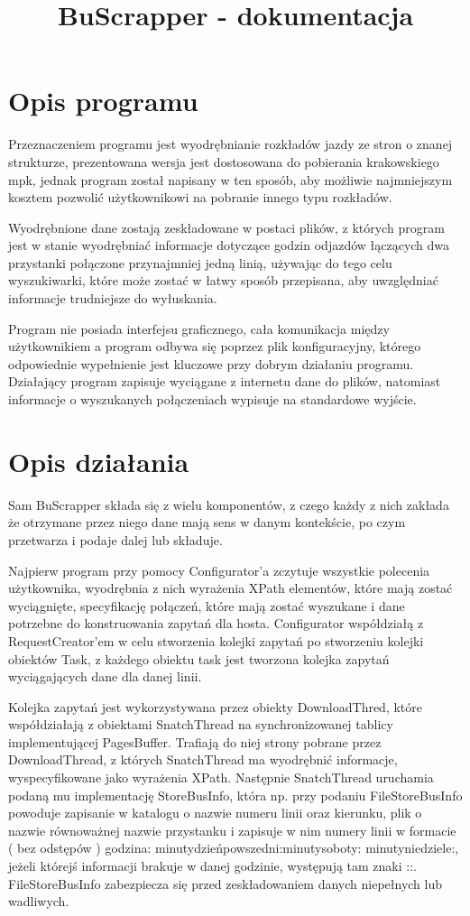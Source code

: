 \documentclass{article}
\title{BuScrapper - dokumentacja}
\begin{document}
\maketitle

\tableofcontents

\section{Opis programu}
Przeznaczeniem programu jest wyodrębnianie rozkładów jazdy ze stron o znanej strukturze, prezentowana wersja jest dostosowana do pobierania krakowskiego mpk, jednak program został napisany w ten sposób, aby możliwie najmniejszym kosztem pozwolić użytkownikowi na pobranie innego typu rozkładów.

Wyodrębnione dane zostają zeskładowane w postaci plików, z których program jest w stanie wyodrębniać informacje dotyczące godzin odjazdów łączących dwa przystanki połączone przynajmniej jedną linią, używając do tego celu wyszukiwarki, które może zostać w łatwy sposób przepisana, aby uwzględniać informacje trudniejsze do wyłuskania.

Program nie posiada interfejsu graficznego, cała komunikacja między użytkownikiem a program odbywa się poprzez plik konfiguracyjny, którego odpowiednie wypełnienie jest kluczowe przy dobrym działaniu programu. Działający program zapisuje wyciągane z internetu dane do plików, natomiast informacje o wyszukanych połączeniach wypisuje na standardowe wyjście.

\section{Opis działania}
Sam BuScrapper składa się z wielu komponentów, z czego każdy z nich zakłada że otrzymane przez niego dane mają sens w danym kontekście, po czym przetwarza i podaje dalej lub składuje.

Najpierw program przy pomocy Configurator'a zczytuje wszystkie polecenia użytkownika, wyodrębnia z nich wyrażenia XPath elementów, które mają zostać wyciągnięte, specyfikację połączeń, które mają zostać wyszukane i dane potrzebne do konstruowania zapytań dla hosta. Configurator współdziałą z RequestCreator'em w celu stworzenia kolejki zapytań po stworzeniu kolejki obiektów Task, z każdego obiektu task jest tworzona kolejka zapytań wyciągających dane dla danej linii.

Kolejka zapytań jest wykorzystywana przez obiekty DownloadThred, które współdziałają z obiektami SnatchThread na synchronizowanej tablicy implementującej PagesBuffer. Trafiają do niej strony pobrane przez DownloadThread, z których SnatchThread ma wyodrębnić informacje, wyspecyfikowane jako wyrażenia XPath. Następnie SnatchThread uruchamia podaną mu implementację StoreBusInfo, która np. przy podaniu FileStoreBusInfo powoduje zapisanie w katalogu o nazwie numeru linii oraz kierunku, plik o nazwie równoważnej nazwie przystanku i zapisuje w nim numery linii w formacie ( bez odstępów ) godzina: minutydzieńpowszedni:minutysoboty: minutyniedziele:, jeżeli którejś informacji brakuje w danej godzinie, występują tam znaki ::. FileStoreBusInfo zabezpiecza się przed zeskładowaniem danych niepełnych lub wadliwych.
\end{document}
